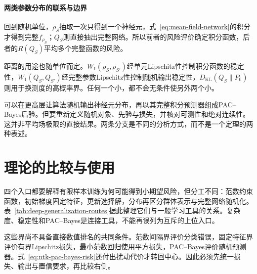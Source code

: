 \paragraph{两类参数分布的联系与边界}

回到随机单位，$\rho_S$抽取一次只得到一个神经元，式~\eqref{eq:mean-field-network}的积分才得到完整$f_{\rho_S}$；$Q_S$则直接抽出完整网络。所以前者的风险评价确定积分函数，后者的$R(Q_S)$平均多个完整函数的风险。

距离的用途也随单位而定。$W_1(\rho_S,\rho_{S'})$经单元Lipschitz性控制积分函数的稳定性，$W_1(Q_S,Q_{S'})$经完整参数Lipschitz性控制随机输出稳定性，$D_{\mathrm{KL}}(Q_S\|P_0)$则用于换测度的高概率界。任何一个小，都不会无条件使另外两个小。

可以在更高层让算法随机输出神经元分布，再以其完整积分预测器组成PAC--Bayes后验。但要重新定义随机对象、先验与损失，并核对可测性和绝对连续性。这并非平均场极限的直接结果。两条分支是不同的分析方式，而不是一个定理的两种表述。

\FloatBarrier
\section{理论的比较与使用}
\label{sec:deep-theory-comparison}

四个入口都要解释有限样本训练为何可能得到小期望风险，但分工不同：范数约束函数，初始梯度固定特征，更新选择解，分布再区分群体表示与完整网络随机化。表~\ref{tab:deep-generalization-routes}据此整理它们与一般学习工具的关系。复杂度、稳定性和PAC--Bayes是连接工具，不能再误列为互斥的上位入口。

这些界尚不具备直接数值排名的共同条件。范数间隔界评价分类错误，固定特征界评价有界Lipschitz损失，最小范数回归使用平方损失，PAC--Bayes评价随机预测器。式~\eqref{eq:ntk-pac-bayes-risk}还付出扰动代价才转回中心。因此必须先统一损失、输出与置信要求，再比较右侧。

